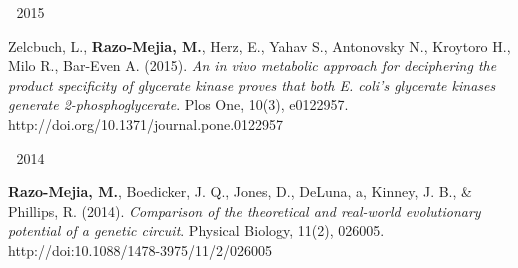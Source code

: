 \begin{cventries}

\cventry
    {$\;$}
    {2015}
    {$\;$}
    {$\;$}
    {
      \begin{cvitems}
        \item {
        \begin{flushleft}
           Zelcbuch, L., \textbf{Razo-Mejia, M.}, Herz, E., Yahav S.,
           Antonovsky N., Kroytoro H., Milo R., Bar-Even A. (2015). \textit{An
           in vivo metabolic approach for deciphering the product specificity
           of glycerate kinase proves that both E. coli's glycerate kinases
           generate 2-phosphoglycerate}. Plos One, 10(3), e0122957.\linebreak
           http://doi.org/10.1371/journal.pone.0122957
        \end{flushleft}
        }
      \end{cvitems}
    }
\cventry
    {$\;$}
    {2014}
    {$\;$}
    {$\;$}
    {
      \begin{cvitems}
        \item {
        \begin{flushleft}
           \textbf{Razo-Mejia, M.}, Boedicker, J. Q., Jones, D., DeLuna, a,
           Kinney, J. B., \& Phillips, R. (2014). \textit{Comparison of the
           theoretical and real-world evolutionary potential of a genetic
           circuit}. Physical Biology, 11(2), 026005.\linebreak
           http://doi:10.1088/1478-3975/11/2/026005
        \end{flushleft}
        }
      \end{cvitems}
    }


\end{cventries}
